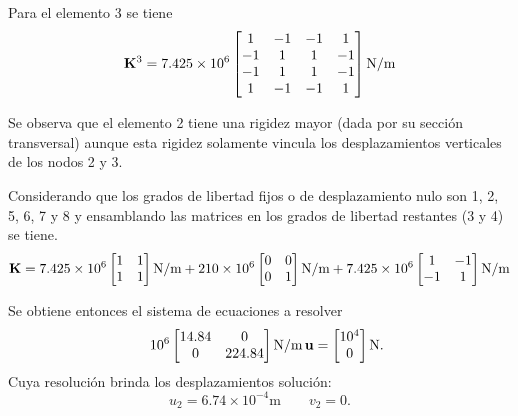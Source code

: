 Para el elemento 3 se tiene
\begin{equation}
{\bf K}^3 = 7.425 \times 10^6
\left[
\begin{matrix}
1 & -1 & -1 & 1 \\
-1 & 1 & 1 & -1\\
-1 & 1 &  1 & -1\\
1 & -1 & -1 & 1
\end{matrix}
\right]
\text{N/m}
\end{equation}



Se observa que el elemento 2 tiene una rigidez mayor (dada por su sección transversal) aunque esta rigidez solamente vincula los desplazamientos verticales de los nodos 2 y 3.

Considerando que los grados de libertad fijos o de desplazamiento nulo son 1, 2, 5, 6, 7 y 8 y ensamblando las matrices en los grados de libertad restantes (3 y 4) se tiene.
%
\begin{equation}
{\bf K} =
7.425 \times 10^6
\left[
\begin{matrix}
1 & 1 \\
1 & 1 
\end{matrix}
\right]
\text{N/m}
+
210 \times 10^6
\left[
\begin{matrix}
0 & 0 \\
0 & 1 
\end{matrix}
\right]
\text{N/m}
+
7.425 \times 10^6
\left[
\begin{matrix}
1 & -1 \\
-1 & 1 
\end{matrix}
\right]
\text{N/m}
\end{equation}


Se obtiene entonces el sistema de ecuaciones a resolver
\begin{equation}
\quad 10^6
\left[
\begin{matrix}
14.84 & 0 \\
0 & 224.84 
\end{matrix}
\right]
\text{N/m}
\,
{\bf u} = 
\left[
\begin{matrix}
10^4 \\
0 
\end{matrix}
\right] \text{N}.
\end{equation}
%
Cuya resolución brinda los desplazamientos solución:
%
\begin{equation}
\boxed{
	u_{2} = 6.74 \times 10^{-4} \text{m}  \qquad v_{2} = 0.
}\end{equation}

